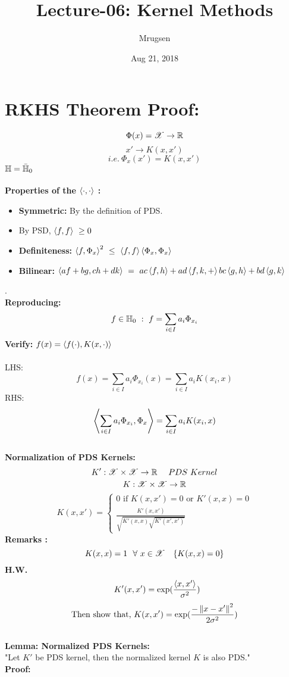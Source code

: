 \documentclass[a4paper,english,12pt]{article}
\title{Lecture-06: Kernel Methods}
\date{Aug 21, 2018}
\author{Mrugsen}
\begin{document}
\maketitle
\section{RKHS Theorem Proof:}

	$$\Phi(x) = \mathscr{X} \to \mathbb{R}$$
	$$x'\to K(x,x')$$
	$$i.e.~\Phi_x(x')=K(x,x')$$
	$\mathbb{H}=\bar{\mathbb{H}}_0$
	\\\\
	\textbf{Properties of the $\left\langle\cdot, \cdot\right\rangle$ :}
	\begin{itemize}
		\item \textbf{Symmetric:} By the definition of PDS.
		\item By PSD, $\left\langle f, f\right\rangle~\geq 0$
		\item \textbf{Definiteness:} $\left\langle f, \Phi_x\right\rangle^2~\leq~\left\langle f, f\right\rangle\left\langle\Phi_x, \Phi_x\right\rangle$
		\item \textbf{Bilinear:} $\left\langle af+bg, ch+dk\right\rangle~=~ac\left\langle f, h\right\rangle+ad\left\langle f,k, +\right\rangle bc\left\langle g, h\right\rangle+bd\left\langle g, k\right\rangle$ 
	\end{itemize}
    .\\
    \textbf{Reproducing:}
    $$f\in\mathbb{H}_0~:~f=\sum_{i \in I}a_i\Phi_{x_i}$$
    \textbf{Verify:} $f(x)=\left\langle f(\cdot), K(x,\cdot)\right\rangle$
    \\\\
    LHS: $$f(x)=\sum_{i \in I}a_i\Phi_{x_i}(x)=\sum_{i \in I}a_i K(x_i,x)$$
    RHS: $$\left\langle\sum_{i \in I}a_i\Phi_{x_i}, \Phi_x\right\rangle=\sum_{i \in I}a_iK(x_i,x)$$
    \\
    \textbf{Normalization of PDS Kernels:}
    $$K':\mathscr{X} \times \mathscr{X} \to \mathbb{R}~~~~PDS~Kernel$$
    $$K:\mathscr{X} \times \mathscr{X} \to \mathbb{R}$$
    \[
      K(x,x')=
              \begin{cases}
               0 \text{ if } K(x,x')=0 \text{ or } K'(x,x)=0 \\
               \frac{K'(x,x')}{\sqrt{K'(x,x)\sqrt{K'(x',x')}}}
              \end{cases}
    \]
    \textbf{Remarks :}
    $$K(x,x)=1~~\forall~x\in\mathscr{X}~~~\{K(x,x)=0\}$$
    \textbf{H.W.}$$~~K'(x,x')=\exp(\frac{\left\langle x, x'\right\rangle}{\sigma^2})$$
    $$\text{Then show that, }K(x,x')=\exp(\frac{-\left\lVert x-x'\right\rVert^2}{2\sigma^2})$$
    \\
    \textbf{Lemma: Normalized PDS Kernels:}\\
    "Let $K'$ be PDS kernel, then the normalized kernel $K$ is also PDS."\\
    \textbf{Proof:}
\end{document}
